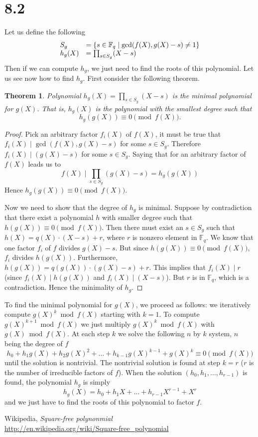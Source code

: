 \documentclass[12pt,a4paper]{article}
\newtheorem{thm}{Theorem}
\begin{document}
\section*{8.2}
Let us define the following
\[
    \begin{array}{l l}
        S_g &= \{ s \in \mathbb{F}_q \mid \gcd(f(X),g(X)-s) \neq 1 \} \\
        h_g(X) &= \prod_{s\in S_g} (X - s)\\
    \end{array}
\]
Then if we can compute $h_g$, we just need to find the roots of this polynomial.
Let us see now how to find $h_g$. First consider the following theorem.
\begin{thm}
    Polynomial $h_g(X) = \prod_{s\in S_g} (X - s)$ is the minimal polynomial for $g(X)$. That is, $h_g(X)$ is the polynomial with the smallest degree
    such that \[h_g(g(X)) \equiv 0 \pmod{f(X)}.\]
\end{thm}
\begin{proof}
    Pick an arbitrary factor $f_i(X)$ of $f(X)$, it must be true that $f_i(X) \mid \gcd(f(X),g(X) - s)$ for some $s \in S_g$.
    Therefore $f_i(X) \mid (g(X) - s)$ for some $s\in S_g$. Saying that for an arbitrary factor of $f(X)$ leads us to
    \[
        f(X) \mid \prod_{s\in S_g}(g(X) - s)  = h_g(g(X))
    \]
    Hence $h_g(g(X)) \equiv 0 \pmod{f(X)}$.

    Now we need to show that the degree of $h_g$ is minimal.
    Suppose by contradiction that there exist a polynomial $h$ with smaller degree such that $h(g(X)) \equiv 0 \pmod{f(X)}$.
    Then there must exist an $s \in S_g$ such that $h(X) = q(X) \cdot (X - s) + r$, where $r$ is nonzero element in $\mathbb{F}_q$.
    We know that one factor $f_i$ of $f$ divides $g(X) - s$. But since $h(g(X)) \equiv 0 \pmod{f(X)}$, $f_i$ divides $h(g(X))$.
    Furthermore, $h(g(X)) = q(g(X)) \cdot (g(X) - s) + r$. This implies that $f_i(X) \mid r$ (since $f_i(X)\mid h(g(X))$ and $f_i(X) \mid (X - s)$).
    But $r$ is in $\mathbb{F}_q$, which is a contradiction. Hence the minimality of $h_g$.
\end{proof}

To find the minimal polynomial for $g(X)$, we proceed as follows: we iteratively compute $g(X)^k \bmod f(X)$ starting with $k = 1$. To compute 
$g(X)^{k+1} \bmod f(X)$ we just multiply $g(X)^k \bmod f(X)$ with $g(X) \bmod f(X)$. At each step $k$ we solve the following $n$ by $k$ system, $n$ being the degree of $f$
\[
    h_0 + h_1 g(X) + h_2 g(X)^2 + \dots + h_{k-1}g(X)^{k-1} + g(X)^k \equiv 0 \pmod{f(X)}
\]
until the solution is nontrivial. The nontrivial solution is found at step $k=r$ ($r$ is the number of irreducible factors of $f$).
When the solution $(h_0,h_1,\dots,h_{r-1})$ is found, the polynomial $h_g$ is simply
\[
    h_g(X) = h_0 + h_1 X + \dots + h_{r-1} X^{r-1} + X^r
\]
and we just have to find the roots of this polynomial to factor $f$.


\begin{thebibliography}{1}
        Wikipedia, \emph{Square-free polynonmial}\\
        \url{http://en.wikipedia.org/wiki/Square-free\_polynomial}
\end{thebibliography}
\end{document}
